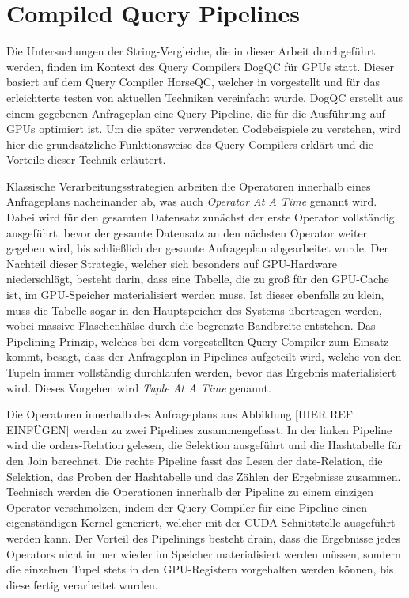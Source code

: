\chapter{Compiled Query Pipelines}

Die Untersuchungen der String-Vergleiche, die in dieser Arbeit durchgeführt werden, finden im Kontext des Query Compilers DogQC für GPUs statt.
Dieser basiert auf dem Query Compiler HorseQC, welcher in \cite{Funke2018} vorgestellt und für das erleichterte testen von aktuellen Techniken vereinfacht wurde.
DogQC erstellt aus einem gegebenen Anfrageplan eine Query Pipeline, die für die Ausführung auf GPUs optimiert ist.
Um die später verwendeten Codebeispiele zu verstehen, wird hier die grundsätzliche Funktionsweise des Query Compilers erklärt und die Vorteile dieser Technik erläutert.

Klassische Verarbeitungsstrategien arbeiten die Operatoren innerhalb eines Anfrageplans nacheinander ab, was auch \emph{Operator At A Time} genannt wird.
Dabei wird für den gesamten Datensatz zunächst der erste Operator vollständig ausgeführt, bevor der gesamte Datensatz an den nächsten Operator weiter gegeben wird, bis schließlich der gesamte Anfrageplan abgearbeitet wurde.
Der Nachteil dieser Strategie, welcher sich besonders auf GPU-Hardware niederschlägt, besteht darin, dass eine Tabelle, die zu groß für den GPU-Cache ist, im GPU-Speicher materialisiert werden muss.
Ist dieser ebenfalls zu klein, muss die Tabelle sogar in den Hauptspeicher des Systems übertragen werden, wobei massive Flaschenhälse durch die begrenzte Bandbreite entstehen.
Das Pipelining-Prinzip, welches bei dem vorgestellten Query Compiler zum Einsatz kommt, besagt, dass der Anfrageplan in Pipelines aufgeteilt wird, welche von den Tupeln immer vollständig durchlaufen werden, bevor das Ergebnis materialisiert wird.
Dieses Vorgehen wird \emph{Tuple At A Time} genannt.


Die Operatoren innerhalb des Anfrageplans aus Abbildung [HIER REF EINFÜGEN] werden zu zwei Pipelines zusammengefasst.
In der linken Pipeline wird die \textsf{orders}-Relation gelesen, die Selektion ausgeführt und die Hashtabelle für den Join berechnet.
Die rechte Pipeline fasst das Lesen der \textsf{date}-Relation, die Selektion, das Proben der Hashtabelle und das Zählen der Ergebnisse zusammen.
Technisch werden die Operationen innerhalb der Pipeline zu einem einzigen Operator verschmolzen, indem der Query Compiler für eine Pipeline einen eigenständigen Kernel generiert, welcher mit der CUDA-Schnittstelle ausgeführt werden kann.
Der Vorteil des Pipelinings besteht drain, dass die Ergebnisse jedes Operators nicht immer wieder im Speicher materialisiert werden müssen, sondern die einzelnen Tupel stets in den GPU-Registern vorgehalten werden können, bis diese fertig verarbeitet wurden.

